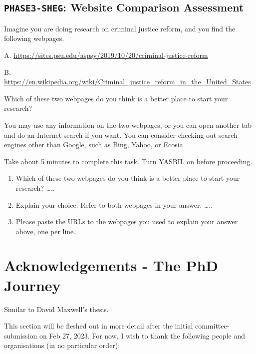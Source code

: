 \documentclass[letterpaper, nobind]{templates/ociamthesis}
\providecommand{\tightlist}{%
  \setlength{\itemsep}{0pt}\setlength{\parskip}{0pt}}
\begin{document}
\hypertarget{app-phase3-sheg}{%
\section{\texorpdfstring{\texttt{PHASE3-SHEG}: Website Comparison Assessment}{PHASE3-SHEG: Website Comparison Assessment}}\label{app-phase3-sheg}}

Imagine you are doing research on criminal justice reform, and you find the following webpages.

A. \url{https://sites.psu.edu/aspsy/2019/10/20/criminal-justice-reform}

B. \url{https://en.wikipedia.org/wiki/Criminal_justice_reform_in_the_United_States}

Which of these two webpages do you think is a better place to start your research?

You may use any information on the two webpages, or you can open another tab and do an Internet search if you want. You can consider checking out search engines other than Google, such as Bing, Yahoo, or Ecosia.

Take about 5 minutes to complete this task. Turn YASBIL on before proceeding.

\begin{enumerate}
\def\labelenumi{\arabic{enumi}.}
\tightlist
\item
  Which of these two webpages do you think is a better place to start your research? \ldots..
\item
  Explain your choice. Refer to both webpages in your answer. \ldots..
\item
  Please paste the URLs to the webpages you used to explain your answer above, one per line.
\end{enumerate}

\hypertarget{sec-app-ack}{%
\chapter{Acknowledgements - The PhD Journey}\label{sec-app-ack}}

Similar to David Maxwell's thesis.

This section will be fleshed out in more detail after the initial committee-submission on Feb 27, 2023.
For now, I wish to thank the following people and organisations (in no particular order):
\end{document}
